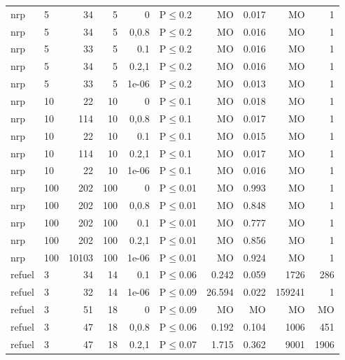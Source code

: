 \begin{longtable}{llrrrlrrrr}
 nrp           & 5        &     	34 &   5 & 0     & P$\leq$0.2   & MO       & 0.017    & MO      & 1       \\
 nrp           & 5        &     	34 &   5 & 0,0.8 & P$\leq$0.2   & MO       & 0.016    & MO      & 1       \\
 nrp           & 5        &     	33 &   5 & 0.1   & P$\leq$0.2   & MO       & 0.016    & MO      & 1       \\
 nrp           & 5        &     	34 &   5 & 0.2,1 & P$\leq$0.2   & MO       & 0.016    & MO      & 1       \\
 nrp           & 5        &     	33 &   5 & 1e-06 & P$\leq$0.2   & MO       & 0.013    & MO      & 1       \\
 nrp           & 10       &     	22 &  10 & 0     & P$\leq$0.1   & MO       & 0.018    & MO      & 1       \\
 nrp           & 10       &    	114 &  10 & 0,0.8 & P$\leq$0.1   & MO       & 0.017    & MO      & 1       \\
 nrp           & 10       &     	22 &  10 & 0.1   & P$\leq$0.1   & MO       & 0.015    & MO      & 1       \\
 nrp           & 10       &    	114 &  10 & 0.2,1 & P$\leq$0.1   & MO       & 0.017    & MO      & 1       \\
 nrp           & 10       &     	22 &  10 & 1e-06 & P$\leq$0.1   & MO       & 0.016    & MO      & 1       \\
 nrp           & 100      &    	202 & 100 & 0     & P$\leq$0.01  & MO       & 0.993    & MO      & 1       \\
 nrp           & 100      &    	202 & 100 & 0,0.8 & P$\leq$0.01  & MO       & 0.848    & MO      & 1       \\
 nrp           & 100      &    	202 & 100 & 0.1   & P$\leq$0.01  & MO       & 0.777    & MO      & 1       \\
 nrp           & 100      &    	202 & 100 & 0.2,1 & P$\leq$0.01  & MO       & 0.856    & MO      & 1       \\
 nrp           & 100      &  	10103 & 100 & 1e-06 & P$\leq$0.01  & MO       & 0.924    & MO      & 1       \\
 refuel        & 3        &     	34 &  14 & 0.1   & P$\leq$0.06  & 0.242    & 0.059    & 1726    & 286     \\
 refuel        & 3        &     	32 &  14 & 1e-06 & P$\leq$0.09  & 26.594   & 0.022    & 159241  & 1       \\
 refuel        & 3        &     	51 &  18 & 0     & P$\leq$0.09  & MO       & MO       & MO      & MO      \\
 refuel        & 3        &     	47 &  18 & 0,0.8 & P$\leq$0.06  & 0.192    & 0.104    & 1006    & 451     \\
 refuel        & 3        &     	47 &  18 & 0.2,1 & P$\leq$0.07  & 1.715    & 0.362    & 9001    & 1906    \\
\bottomrule
\end{longtable}
